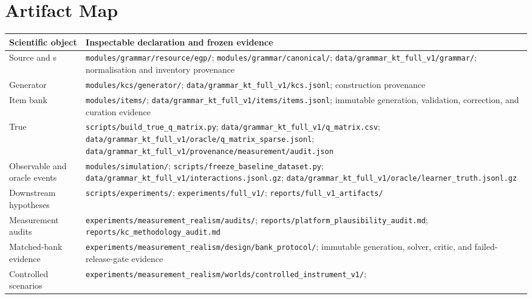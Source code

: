 \section{Artifact Map}
\label{sec:artifact-map}

\begin{center}
  \footnotesize
  \begin{tabularx}{\columnwidth}{@{}p{} >{\raggedright\arraybackslash}X@{}}
    \toprule
    Scientific object & Inspectable declaration and frozen evidence \\
    \midrule
    Source and \grammarcell{}s &
      \nolinkurl{modules/grammar/resource/egp/};
      \nolinkurl{modules/grammar/canonical/};
      \nolinkurl{data/grammar_kt_full_v1/grammar/}; normalisation and inventory
      provenance \\
    Generator \kstar{} &
      \nolinkurl{modules/kcs/generator/};
      \nolinkurl{data/grammar_kt_full_v1/kcs.jsonl}; construction provenance \\
    Item bank &
      \nolinkurl{modules/items/};
      \nolinkurl{data/grammar_kt_full_v1/items/items.jsonl}; immutable generation,
      validation, correction, and curation evidence \\
    True \qstar{} &
      \nolinkurl{scripts/build_true_q_matrix.py};
      \nolinkurl{data/grammar_kt_full_v1/q_matrix.csv};
      \nolinkurl{data/grammar_kt_full_v1/oracle/q_matrix_sparse.jsonl};
      \nolinkurl{data/grammar_kt_full_v1/provenance/measurement/audit.json} \\
    Observable and oracle events &
      \nolinkurl{modules/simulation/};
      \nolinkurl{scripts/freeze_baseline_dataset.py};
      \nolinkurl{data/grammar_kt_full_v1/interactions.jsonl.gz};
      \nolinkurl{data/grammar_kt_full_v1/oracle/learner_truth.jsonl.gz} \\
    Downstream hypotheses &
      \nolinkurl{scripts/experiments/};
      \nolinkurl{experiments/full_v1/};
      \nolinkurl{reports/full_v1_artifacts/} \\
    Measurement audits &
      \nolinkurl{experiments/measurement_realism/audits/};
      \nolinkurl{reports/platform_plausibility_audit.md};
      \nolinkurl{reports/kc_methodology_audit.md} \\
    Matched-bank evidence &
      \nolinkurl{experiments/measurement_realism/design/bank_protocol/};
      immutable generation, solver, critic, and failed-release-gate evidence \\
    Controlled scenarios &
      \nolinkurl{experiments/measurement_realism/worlds/controlled_instrument_v1/};

\end{tabularx}
\end{center}
